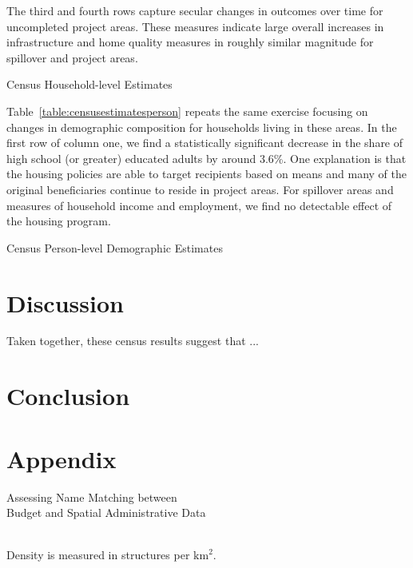 \documentclass[12pt]{article}
\begin{document}
The third and fourth rows capture secular changes in outcomes over time for uncompleted project areas.  These measures indicate large overall increases in infrastructure and home quality measures in roughly similar magnitude for spillover and project areas.

\begin{table}
\caption{Census Household-level Estimates}\label{table:censusestimates}
\centering
\begin{adjustbox}{angle=90}
\resizebox{\textheight}{!}{  

}
\end{adjustbox}
\end{table}

Table~\ref{table:censusestimatesperson} repeats the same exercise focusing on changes in demographic composition for households living in these areas.  In the first row of column one, we find a statistically significant decrease in the share of high school (or greater) educated adults by around 3.6\%.  One explanation is that the housing policies are able to target recipients based on means and many of the original beneficiaries continue to reside in project areas.  For spillover areas and measures of household income and employment, we find no detectable effect of the housing program.

\begin{table} 
\caption{Census Person-level Demographic Estimates}\label{table:censusestimatesperson}
\centering 

\end{table}


\section{Discussion}


Taken together, these census results suggest that ...





\section{Conclusion}











{}
\nocite{*}
\singlespacing
\setlength\bibsep{0pt}






\appendix
\doublespacing

\section*{Appendix}

\begin{table}
	\centering
	\caption{Assessing Name Matching between \\Budget and Spatial Administrative Data}\label{table:stringmatch}
 \\
Density is measured in structures per $\text{km}^{2}$.

\end{table}
\end{document}
